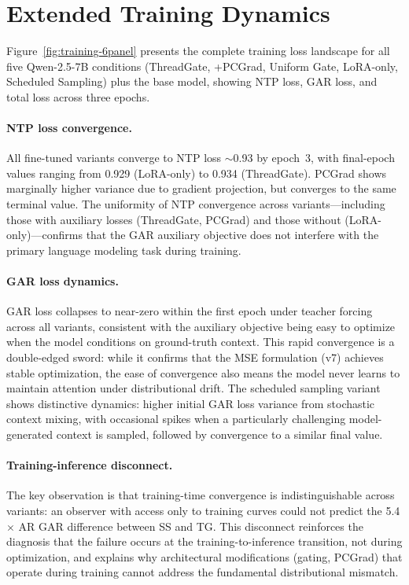 

\section{Extended Training Dynamics}\label{sec:appendix-training-ext}

Figure~\ref{fig:training-6panel} presents the complete training loss landscape for all five Qwen-2.5-7B conditions (ThreadGate, +PCGrad, Uniform Gate, LoRA-only, Scheduled Sampling) plus the base model, showing NTP loss, GAR loss, and total loss across three epochs.

\paragraph{NTP loss convergence.} All fine-tuned variants converge to NTP loss ${\sim}$0.93 by epoch~3, with final-epoch values ranging from 0.929 (LoRA-only) to 0.934 (ThreadGate). PCGrad shows marginally higher variance due to gradient projection, but converges to the same terminal value. The uniformity of NTP convergence across variants---including those with auxiliary losses (ThreadGate, PCGrad) and those without (LoRA-only)---confirms that the GAR auxiliary objective does not interfere with the primary language modeling task during training.

\paragraph{GAR loss dynamics.} GAR loss collapses to near-zero within the first epoch under teacher forcing across all variants, consistent with the auxiliary objective being easy to optimize when the model conditions on ground-truth context. This rapid convergence is a double-edged sword: while it confirms that the MSE formulation (v7) achieves stable optimization, the ease of convergence also means the model never learns to maintain attention under distributional drift. The scheduled sampling variant shows distinctive dynamics: higher initial GAR loss variance from stochastic context mixing, with occasional spikes when a particularly challenging model-generated context is sampled, followed by convergence to a similar final value.

\paragraph{Training-inference disconnect.} The key observation is that training-time convergence is indistinguishable across variants: an observer with access only to training curves could not predict the 5.4$\times$ AR GAR difference between SS and TG. This disconnect reinforces the diagnosis that the failure occurs at the training-to-inference transition, not during optimization, and explains why architectural modifications (gating, PCGrad) that operate during training cannot address the fundamental distributional mismatch.

